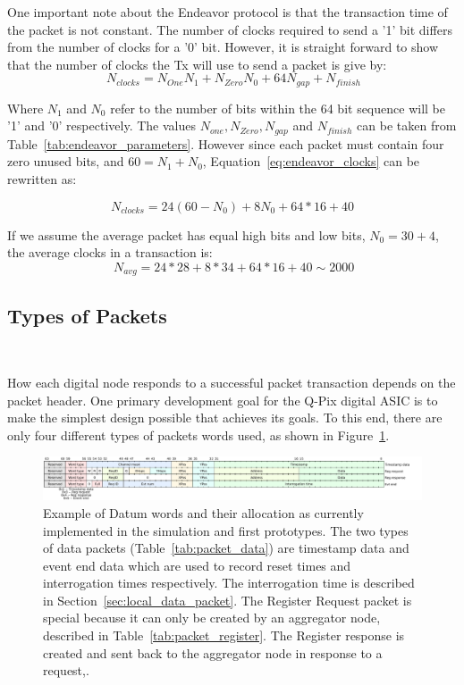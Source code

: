 One important note about the Endeavor protocol is that the transaction time of the packet is not constant.
The number of clocks required to send a '1' bit differs from the number of clocks for a '0' bit.
However, it is straight forward to show that the number of clocks the Tx will use to send a packet is give by:
\begin{equation}~\label{eq:endeavor_clocks}
  N_{clocks} = N_{One}N_{1} + N_{Zero}N_{0} + 64N_{gap} + N_{finish}
\end{equation}

Where $N_{1}$ and $N_{0}$ refer to the number of bits within the 64 bit sequence will be '1' and '0' respectively.
The values $N_{one}, N_{Zero}, N_{gap}$ and $N_{finish}$ can be taken from Table~\ref{tab:endeavor_parameters}.
However since each packet must contain four zero unused bits, and $60 = N_{1} + N_{0}$, Equation~\ref{eq:endeavor_clocks} can be rewritten as:

\begin{equation}
  N_{clocks} = 24(60 - N_{0}) + 8N_{0} + 64*16 + 40
\end{equation}

If we assume the average packet has equal high bits and low bits, $N_{0} = 30 + 4$, the average clocks in a transaction is:
\begin{equation}~\label{eq:avg_packet}
  N_{avg} = 24*28 + 8*34 + 64*16 + 40 \sim 2000 
\end{equation}


\subsection{Types of Packets}~\label{sec:digi_packets}

How each digital node responds to a successful packet transaction depends on the packet header.
One primary development goal for the Q-Pix digital ASIC is to make the simplest design possible that achieves its goals.
To this end, there are only four different types of packets words used, as shown in Figure~\ref{fig:datum}.

\begin{figure}[]
\centering
\includegraphics[width=\textwidth]{images/qpix_word_format.pdf}
\caption{Example of Datum words and their allocation as currently implemented in the simulation and first prototypes.
The two types of data packets (Table~\ref{tab:packet_data}) are timestamp data and event end data which are used to record reset times and interrogation times respectively.
The interrogation time is described in Section~\ref{sec:local_data_packet}.
The Register Request packet is special because it can only be created by an aggregator node, described in Table~\ref{tab:packet_register}. 
The Register response is created and sent back to the aggregator node in response to a request,.
}
\label{fig:datum}
\end{figure}

